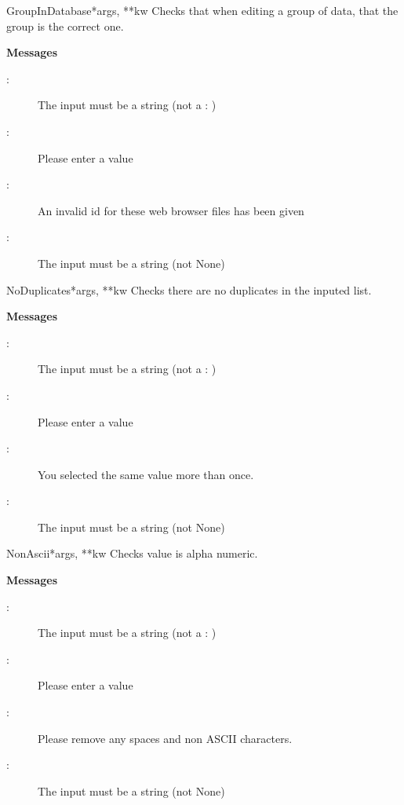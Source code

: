 \documentclass[letterpaper,10pt,english]{manual}
\begin{document}
\hypertarget{webscavator.forms.validators.GroupInDatabase}{}\begin{classdesc}{GroupInDatabase}{*args, **kw}
Checks that when editing a group of data, that the group is the correct one.

\textbf{Messages}
\begin{description}
\item[:]
The input must be a string (not a : )

\item[:]
Please enter a value

\item[:]
An invalid id for these web browser files has been given

\item[:]
The input must be a string (not None)

\end{description}
\end{classdesc}

\hypertarget{webscavator.forms.validators.NoDuplicates}{}\begin{classdesc}{NoDuplicates}{*args, **kw}
Checks there are no duplicates in the inputed list.

\textbf{Messages}
\begin{description}
\item[:]
The input must be a string (not a : )

\item[:]
Please enter a value

\item[:]
You selected the same value more than once.

\item[:]
The input must be a string (not None)

\end{description}
\end{classdesc}

\hypertarget{webscavator.forms.validators.NonAscii}{}\begin{classdesc}{NonAscii}{*args, **kw}
Checks value is alpha numeric.

\textbf{Messages}
\begin{description}
\item[:]
The input must be a string (not a : )

\item[:]
Please enter a value

\item[:]
Please remove any spaces and non ASCII characters.

\item[:]
The input must be a string (not None)

\end{description}
\end{classdesc}
\end{document}

